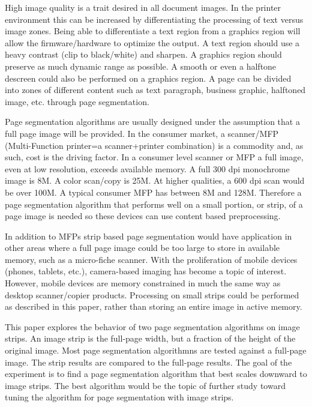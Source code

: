 \documentclass[conference]{IEEEtran}
\begin{document}
High image quality is a trait desired in all document images.
In the printer environment this can be increased by differentiating the processing of text versus image zones.
Being able to differentiate a text region from a graphics region
will allow the firmware/hardware to optimize the output. A text region should
use a heavy contrast (clip to black/white) and sharpen. A graphics region
should preserve as much dynamic range as possible. A smooth or even a halftone
descreen could also be performed on a graphics region.
A page can be divided into
zones of different content such as text paragraph, business graphic, halftoned
image, etc. through page segmentation.

Page segmentation algorithms are usually designed under the assumption that a full page image will be provided.
In the consumer market, a scanner/MFP (Multi-Function printer=a scanner+printer combination) is a commodity and, as such, cost is the driving factor. 
In a consumer level scanner or MFP a full image, even at low resolution, exceeds available memory. 
A full 300 dpi monochrome image is 8M. A color scan/copy is
25M. At higher qualities, a 600 dpi scan would be over 100M. A typical consumer
MFP has between 8M and 128M. 
Therefore a page segmentation algorithm that performs well on a small portion, or strip, of a page image is needed so these devices can use content based preprocessing.

In addition to MFPs
strip based page segmentation would have application 
in other areas where a full page image could be too large to
store in available memory, such as a micro-fiche scanner. 
With the proliferation of mobile devices (phones, tablets, etc.), camera-based
imaging has become a topic of interest.  However, mobile devices are memory
constrained in much the same way as desktop scanner/copier products. 
Processing on small strips could be performed as described in this paper,
rather than storing an entire image in active memory.

This paper explores the behavior of two page segmentation algorithms on image strips.
An image strip is the full-page width, but a fraction of the height of the original image.
Most page segmentation algorithmns are tested against a full-page image. 
The strip results are compared to the full-page results. The goal of the
experiment is to find a page segmentation algorithm that best scales downward
to image strips. The best algorithm would be the topic of further study toward
tuning the algorithm for page segmentation with image strips.
\end{document}
